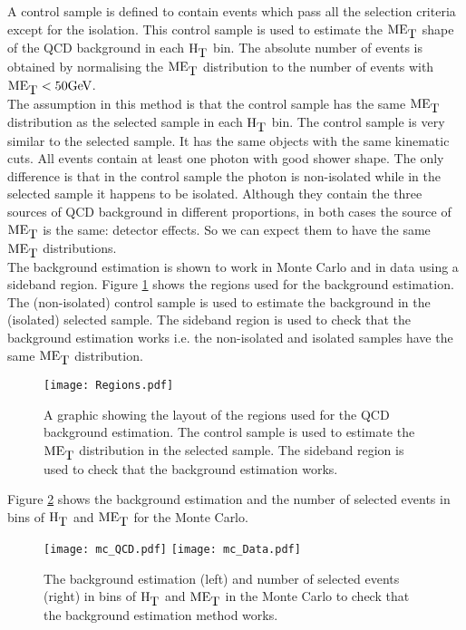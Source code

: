 A control sample is defined to contain events which pass all the selection 
criteria except for the isolation. This control sample is used to estimate the
$\mbox{ME}_{\mbox{T}}$ shape of the QCD background in each $\mbox{H}_{\mbox{T}}$ bin. The absolute number of
events is obtained by normalising the $\mbox{ME}_{\mbox{T}}$ distribution to the number of
events with $\mbox{ME}_{\mbox{T}} < 50 \mbox{GeV}$. \\

The assumption in this method is that the control sample has the same $\mbox{ME}_{\mbox{T}}$
distribution as the selected sample in each $\mbox{H}_{\mbox{T}}$ bin. The control sample is
very similar to the selected sample. It has the same objects with the same
kinematic cuts. All events contain at least one photon with good shower shape.
The only difference is that in the control sample the photon is non-isolated
while in the selected sample it happens to be isolated. Although they contain
the three sources of QCD background in different proportions, in both cases the 
source of $\mbox{ME}_{\mbox{T}}$ is the same: detector effects. So we can expect them to have 
the same $\mbox{ME}_{\mbox{T}}$ distributions. \\

The background estimation is shown to work in Monte Carlo and in data using a 
sideband region. Figure \ref{fig:Regions} shows the regions used for the
background estimation. The (non-isolated) control sample is used to estimate the 
background in the (isolated) selected sample. The sideband region is used to
check that the background estimation works i.e. the non-isolated and isolated 
samples have the same $\mbox{ME}_{\mbox{T}}$ distribution. \\

\begin{figure}
\begin{center}
\texttt{[image: Regions.pdf]}
\end{center}
\caption{A graphic showing the layout of the regions used for the QCD background
estimation. The control sample is used to estimate the $\mbox{ME}_{\mbox{T}}$ distribution in
the selected sample. The sideband region is used to check that the background
estimation works.}
\label{fig:Regions}
\end{figure}

Figure \ref{fig:Bkgd_Est_MC} shows the background estimation and the number of
selected events in bins of $\mbox{H}_{\mbox{T}}$ and $\mbox{ME}_{\mbox{T}}$ for the Monte Carlo. \\

\begin{figure}
\texttt{[image: mc\_QCD.pdf]}
\texttt{[image: mc\_Data.pdf]}
\caption{The background estimation (left) and number of selected events (right) 
in bins of $\mbox{H}_{\mbox{T}}$ and $\mbox{ME}_{\mbox{T}}$ in the Monte Carlo to check that the background
estimation method works.}
\label{fig:Bkgd_Est_MC}
\end{figure}

